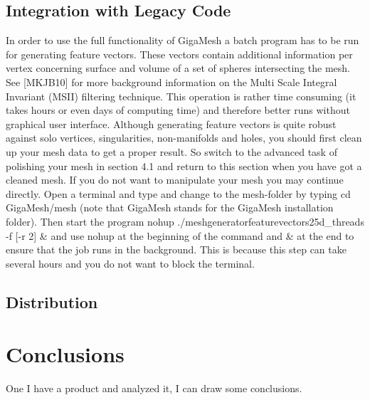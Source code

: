 \documentclass{article}
\begin{document}
\subsection{Integration with Legacy Code}
In order to use the full functionality of GigaMesh a batch program has to be run for generating feature vectors. These vectors contain additional information per vertex concerning surface and volume of a set of spheres intersecting the mesh. See [MKJB10] for more background information on the Multi Scale Integral Invariant (MSII) filtering technique. This operation is rather time consuming (it takes hours or even days of computing time) and therefore better runs without graphical user interface. Although generating feature vectors is quite robust against solo vertices, singularities, non-manifolds and holes, you should first clean up your mesh data to get a proper result. So switch to the advanced task of polishing your mesh in section 4.1 and return to this section when you have got a cleaned mesh. If you do not want to manipulate your mesh you may continue directly. Open a terminal and type and change to the mesh-folder by typing cd GigaMesh/mesh (note that GigaMesh stands for the GigaMesh installation folder). Then start the program 
nohup ./meshgeneratorfeaturevectors25d\_threads -f [-r 2] \& 
and use nohup at the beginning of the command and \& at the end to ensure that the job runs in the background. This is because this step can take several hours and you do not want to block the terminal.~\cite[p.~19]{Giga17}
\subsection{Distribution}
\section{Conclusions}
One I have a product and analyzed it, I can draw some conclusions.
\printindex
\listoffigures
{}

\end{document}
